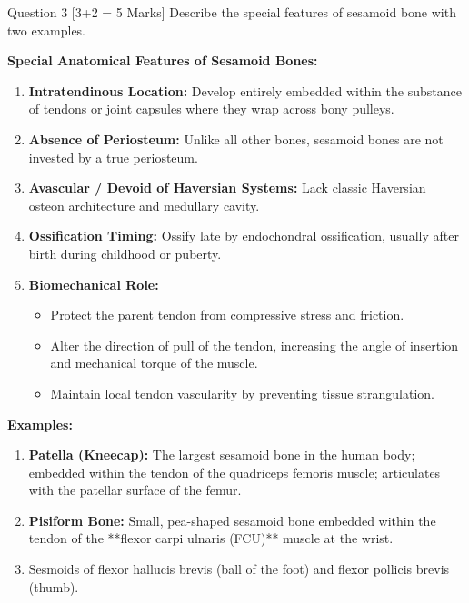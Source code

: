 \documentclass[11pt,a4paper]{article}
\begin{document}
\begin{qbox}{Question 3 [3+2 = 5 Marks]}
Describe the special features of sesamoid bone with two examples.
\end{qbox}

\begin{ansbox}
\textbf{Special Anatomical Features of Sesamoid Bones:}
\begin{enumerate}[leftmargin=*]
    \item \textbf{Intratendinous Location:} Develop entirely embedded within the substance of tendons or joint capsules where they wrap across bony pulleys.
    \item \textbf{Absence of Periosteum:} Unlike all other bones, sesamoid bones are not invested by a true periosteum.
    \item \textbf{Avascular / Devoid of Haversian Systems:} Lack classic Haversian osteon architecture and medullary cavity.
    \item \textbf{Ossification Timing:} Ossify late by endochondral ossification, usually after birth during childhood or puberty.
    \item \textbf{Biomechanical Role:}
    \begin{itemize}
        \item Protect the parent tendon from compressive stress and friction.
        \item Alter the direction of pull of the tendon, increasing the angle of insertion and mechanical torque of the muscle.
        \item Maintain local tendon vascularity by preventing tissue strangulation.
    \end{itemize}
\end{enumerate}

\textbf{Examples:}
\begin{enumerate}[leftmargin=*]
    \item \textbf{Patella (Kneecap):} The largest sesamoid bone in the human body; embedded within the tendon of the quadriceps femoris muscle; articulates with the patellar surface of the femur.
    \item \textbf{Pisiform Bone:} Small, pea-shaped sesamoid bone embedded within the tendon of the **flexor carpi ulnaris (FCU)** muscle at the wrist.
    \item Sesmoids of flexor hallucis brevis (ball of the foot) and flexor pollicis brevis (thumb).
\end{enumerate}
\end{ansbox}
\end{document}
